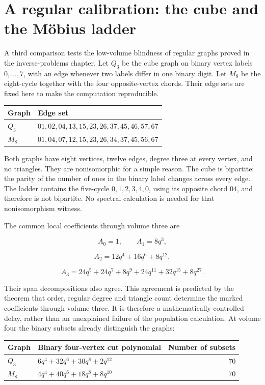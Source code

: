 \documentclass[
  11pt,
  a4paper,
]{report}
\begin{document}
\hypertarget{a-regular-calibration-the-cube-and-the-muxf6bius-ladder}{%
\section{A regular calibration: the cube and the Möbius
ladder}\label{a-regular-calibration-the-cube-and-the-muxf6bius-ladder}}

A third comparison tests the low-volume blindness of regular graphs
proved in the inverse-problems chapter. Let \(Q_3\) be the cube graph on
binary vertex labels \(0,\ldots,7\), with an edge whenever two labels
differ in one binary digit. Let \(M_8\) be the eight-cycle together with
the four opposite-vertex chords. Their edge sets are fixed here to make
the computation reproducible.

\begin{longtable}[]{@{}ll@{}}
\toprule\noalign{}
Graph & Edge set \\
\midrule\noalign{}
\endhead
\bottomrule\noalign{}
\endlastfoot
\(Q_3\) & \(01,02,04,13,15,23,26,37,45,46,57,67\) \\
\(M_8\) & \(01,04,07,12,15,23,26,34,37,45,56,67\) \\
\end{longtable}

Both graphs have eight vertices, twelve edges, degree three at every
vertex, and no triangles. They are nonisomorphic for a simple reason.
The cube is bipartite: the parity of the number of ones in the binary
label changes across every edge. The ladder contains the five-cycle
\(0,1,2,3,4,0\), using its opposite chord \(04\), and therefore is not
bipartite. No spectral calculation is needed for that nonisomorphism
witness.

The common local coefficients through volume three are

\[
A_0=1,\qquad A_1=8q^3,
\]

\[
A_2=12q^4+16q^6+8q^{12},
\]

\[
A_3=24q^5+24q^7+8q^9+24q^{11}+32q^{15}+8q^{27}.
\]

Their span decompositions also agree. This agreement is predicted by the
theorem that order, regular degree and triangle count determine the
marked coefficients through volume three. It is therefore a
mathematically controlled delay, rather than an unexplained failure of
the population calculation. At volume four the binary subsets already
distinguish the graphs:

\begin{longtable}[]{@{}llr@{}}
\toprule\noalign{}
Graph & Binary four-vertex cut polynomial & Number of subsets \\
\midrule\noalign{}
\endhead
\bottomrule\noalign{}
\endlastfoot
\(Q_3\) & \(6q^4+32q^6+30q^8+2q^{12}\) & 70 \\
\(M_8\) & \(4q^4+40q^6+18q^8+8q^{10}\) & 70 \\
\end{longtable}
\end{document}
